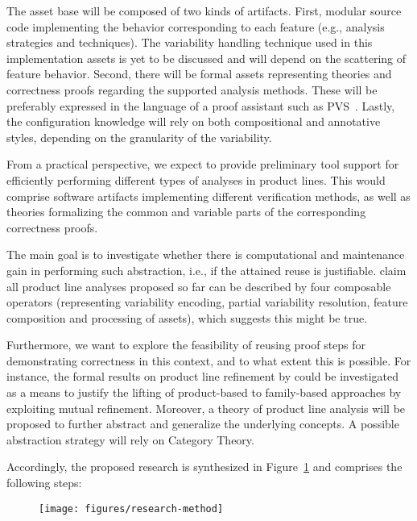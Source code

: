 The asset base will be composed of two kinds of artifacts. First, modular source code implementing the behavior corresponding to each feature (e.g., analysis strategies and techniques). The variability handling technique used in this implementation assets is yet to be discussed and will depend on the scattering of feature behavior. Second, there will be formal assets representing theories and correctness proofs regarding the supported analysis methods. These will be preferably expressed in the language of a proof assistant such as PVS~\citep{PVS:language}. Lastly, the configuration knowledge will rely on both compositional and annotative styles, depending on the granularity of the variability.

From a practical perspective, we expect to provide preliminary tool support for efficiently performing different types of analyses in product lines. This would comprise software artifacts implementing different verification methods, as well as theories formalizing the common and variable parts of the corresponding correctness proofs. 

The main goal is to investigate whether there is computational and maintenance gain in performing such abstraction, i.e., if the attained reuse is justifiable. \cite{PLAModel} claim all product line analyses proposed so far can be described by four composable operators (representing variability encoding, partial variability resolution, feature composition and processing
of assets), which suggests this might be true. 

Furthermore, we want to explore the feasibility of reusing proof steps for demonstrating correctness in this context, and to what extent this
is possible. For instance, the formal results on product line refinement by \cite{Teixeira2015} could be investigated as a means to justify the lifting
of product-based to family-based approaches by exploiting mutual refinement. Moreover, a theory of product line analysis will be proposed to further abstract and generalize the underlying concepts. A possible abstraction strategy will rely on Category Theory.

Accordingly, the proposed research is synthesized in Figure~\ref{fig:method}  and  comprises the following steps:


\begin{figure}
	\centering
	\texttt{[image: figures/research-method]}
	\caption{}
	\label{fig:method}
\end{figure}




